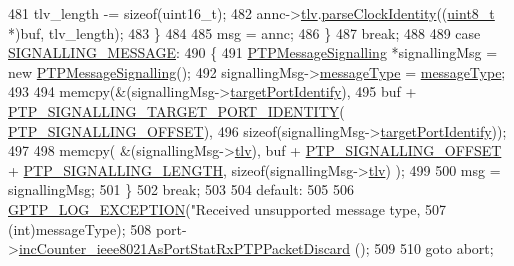 \begin{DoxyCode}
{{{{{{{{481                 tlv\_length -= \textcolor{keyword}{sizeof}(uint16\_t);
482                 annc->\hyperlink{class_p_t_p_message_announce_ac7b185260086ad357ff7a9c29f468936}{tlv}.\hyperlink{class_path_trace_t_l_v_a66b71b1178893f98ba403e961e8fb6cf}{parseClockIdentity}((\hyperlink{stdint_8h_aba7bc1797add20fe3efdf37ced1182c5}{uint8\_t} *)buf, tlv\_length);
483             \}
484 
485             msg = annc;
486         \}
487         \textcolor{keywordflow}{break};
488 
489     \textcolor{keywordflow}{case} \hyperlink{avbts__message_8hpp_ac6606ebe91c8ac66a2c314c79f5ab013a126e822073ff23ccb061021926a152a3}{SIGNALLING\_MESSAGE}:
490         \{
491             \hyperlink{class_p_t_p_message_signalling}{PTPMessageSignalling} *signallingMsg = \textcolor{keyword}{new} 
      \hyperlink{class_p_t_p_message_signalling}{PTPMessageSignalling}();
492             signallingMsg->\hyperlink{class_p_t_p_message_common_adb32627aa5b0e2dbad3ccd88aab07c05}{messageType} = \hyperlink{class_p_t_p_message_common_adb32627aa5b0e2dbad3ccd88aab07c05}{messageType};
493 
494             memcpy(&(signallingMsg->\hyperlink{class_p_t_p_message_signalling_a1d4353212906ed7366ffbf01cb56bdab}{targetPortIdentify}),
495                    buf + \hyperlink{avbts__message_8hpp_a068292a37a4f0716f4b6ba81222fb9a5}{PTP\_SIGNALLING\_TARGET\_PORT\_IDENTITY}(
      \hyperlink{avbts__message_8hpp_a3528ebe88df8c782038079cb1165d540}{PTP\_SIGNALLING\_OFFSET}),
496                    \textcolor{keyword}{sizeof}(signallingMsg->\hyperlink{class_p_t_p_message_signalling_a1d4353212906ed7366ffbf01cb56bdab}{targetPortIdentify}));
497 
498             memcpy( &(signallingMsg->\hyperlink{class_p_t_p_message_signalling_ab458dc952682abd8077ce12fbff3d1d6}{tlv}), buf + \hyperlink{avbts__message_8hpp_a3528ebe88df8c782038079cb1165d540}{PTP\_SIGNALLING\_OFFSET} + 
      \hyperlink{avbts__message_8hpp_ac728b0caa27d25b33564be179caa3ffd}{PTP\_SIGNALLING\_LENGTH}, \textcolor{keyword}{sizeof}(signallingMsg->\hyperlink{class_p_t_p_message_signalling_ab458dc952682abd8077ce12fbff3d1d6}{tlv}) );
499 
500             msg = signallingMsg;
501         \}
502         \textcolor{keywordflow}{break};
503 
504     \textcolor{keywordflow}{default}:
505 
506         \hyperlink{gptp__log_8hpp_a5c9d2f25d8d69eb2e585b35c72896357}{GPTP\_LOG\_EXCEPTION}(\textcolor{stringliteral}{"Received unsupported message type, %
507                     (\textcolor{keywordtype}{int})messageType);
508         port->\hyperlink{class_common_port_ab127287dc3c8d4bed5595b456ba4b17d}{incCounter\_ieee8021AsPortStatRxPTPPacketDiscard}
      ();
509 
510         \textcolor{keywordflow}{goto} abort;
}}}}}}}}}
\end{DoxyCode}
